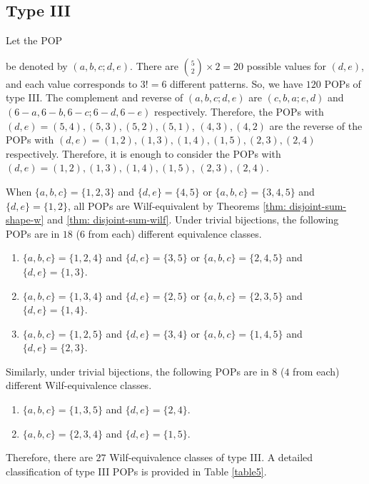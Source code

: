 \documentclass[12pt, english, a4paper]{article}
\theoremstyle{plain}
\theoremstyle{definition}
\theoremstyle{remark}
\begin{document}
\subsection{Type III}
Let the POP   be denoted by $(a,b,c;d,e)$. There are $\binom{5}{2}\times 2=20$ possible values for $(d,e)$, and each value corresponds to $3!=6$ different patterns. So, we have $120$ POPs of type III.  The complement and reverse of $(a,b,c;d,e)$ are $(c,b,a;e,d)$ and $(6-a,6-b,6-c;6-d,6-e)$ respectively. Therefore, the POPs with $(d,e)=(5,4),(5,3),(5,2),(5,1)$, $(4,3),(4,2)$ are the reverse of the POPs with $(d,e)=(1,2),(1,3),(1,4),(1,5),(2,3),(2,4)$ respectively.  Therefore, it is enough to consider the POPs with $(d,e)=(1,2),(1,3),(1,4),(1,5)$, $(2,3),(2,4)$.

When $\{a,b,c\}=\{1,2,3\}$ and $\{d,e\}=\{4,5\}$ or $\{a,b,c\}=\{3,4,5\}$ and $\{d,e\}=\{1,2\}$, all POPs are Wilf-equivalent by Theorems \ref{thm: disjoint-sum-shape-w} and \ref{thm: disjoint-sum-wilf}.    
Under trivial bijections, the following POPs are in $18$ ($6$ from each) different equivalence classes.
    \begin{enumerate}
        \item  $\{a,b,c\}=\{1,2,4\}$ and $\{d,e\}=\{3,5\}$ or $\{a,b,c\}=\{2,4,5\}$ and $\{d,e\}=\{1,3\}$.
        \item $\{a,b,c\}=\{1,3,4\}$ and $\{d,e\}=\{2,5\}$ or $\{a,b,c\}=\{2,3,5\}$ and $\{d,e\}=\{1,4\}$.
        \item $\{a,b,c\}=\{1,2,5\}$ and $\{d,e\}=\{3,4\}$ or $\{a,b,c\}=\{1,4,5\}$ and $\{d,e\}=\{2,3\}$.
    \end{enumerate}
Similarly, under trivial bijections, the following POPs are in $8$ ($4$ from each) different Wilf-equivalence classes.
    \begin{enumerate}
        \item  $\{a,b,c\}=\{1,3,5\}$ and $\{d,e\}=\{2,4\}$.
        \item $\{a,b,c\}=\{2,3,4\}$ and $\{d,e\}=\{1,5\}$.
    \end{enumerate}
Therefore, there are $27$ Wilf-equivalence classes of type III. A detailed classification of type III POPs is provided in Table \ref{table5}.
\end{document}

